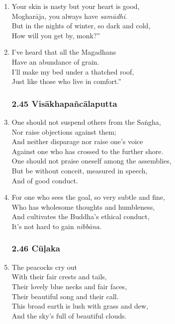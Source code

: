 \documentclass[10pt, openany]{book}
\newcommand*{\vleftofline}[1]{\leavevmode\llap{#1}}
\begin{document}
\begin{enumerate}
\item \vleftofline{“}Your skin is nasty but your heart is good,\\
Mogharāja, you always have \emph{samādhi}.\\
But in the nights of winter, so dark and cold,\\
How will you get by, monk?”

\item \vleftofline{“}I’ve heard that all the Magadhans\\
Have an abundance of grain.\\
I’ll make my bed under a thatched roof,\\
Just like those who live in comfort.”

\subsubsection*{2.45 Visākhapañcālaputta}

\item One should not suspend others from the Saṅgha,\\
Nor raise objections against them;\\
And neither disparage nor raise one’s voice \\
Against one who has crossed to the further shore.\\
One should not praise oneself among the assemblies,\\
But be without conceit, measured in speech, \\
And of good conduct.

\item For one who sees the goal, so very subtle and fine,\\
Who has wholesome thoughts and humbleness,\\
And cultivates the Buddha’s ethical conduct,\\
It’s not hard to gain \emph{nibbāna}.

\subsubsection*{2.46 Cūḷaka}

\item The peacocks cry out\\
With their fair crests and tails,\\
Their lovely blue necks and fair faces,\\
Their beautiful song and their call.\\
This broad earth is lush with grass and dew,\\
And the sky’s full of beautiful clouds.


\end{enumerate}
\end{document}
